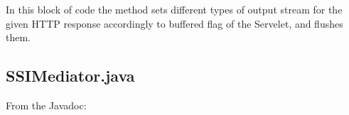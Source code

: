 \documentclass[11pt,titlepage]{article} %
\begin{document}
\begin{itemize}
      In this block of code the method sets different types of output stream for the given HTTP response accordingly to buffered flag of the Servelet,
      and flushes them.
      
      
      

  \end{itemize}

\subsection{SSIMediator.java}
  From the Javadoc:
  
  
  
\end{document}
